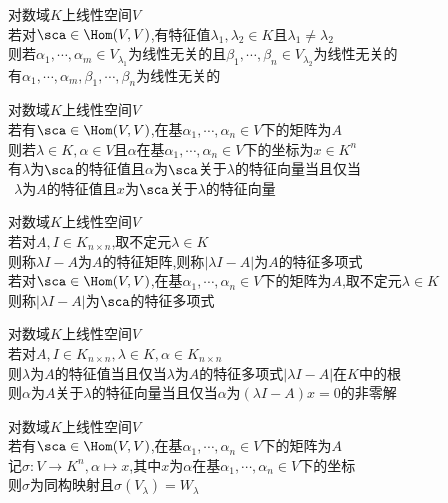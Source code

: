 \begin{dingli}
对数域$K$上线性空间$V$\\
若对$\sca\in\Hom(V,V)$,有特征值$\lambda_1,\lambda_2\in K$且$\lambda_1\neq\lambda_2$\\
则若$\alpha_1,\cdots,\alpha_m\in V_{\lambda_1}$为线性无关的且$\beta_1,\cdots,\beta_n\in V_{\lambda_2}$为线性无关的\\
有$\alpha_1,\cdots,\alpha_m,\beta_1,\cdots,\beta_n$为线性无关的
\end{dingli}

\begin{dingli}
对数域$K$上线性空间$V$\\
若有$\sca\in \Hom(V,V)$,在基$\alpha_1,\cdots,\alpha_n\in V$下的矩阵为$A$\\
则若$\lambda\in K,\alpha\in V$且$\alpha$在基$\alpha_1,\cdots,\alpha_n\in V$下的坐标为$x\in K^n$\\
有$\lambda$为$\sca$的特征值且$\alpha$为$\sca$关于$\lambda$的特征向量当且仅当\\
$\ \ \lambda$为$A$的特征值且$x$为$\sca$关于$\lambda$的特征向量
\end{dingli}

\begin{dingyi}
对数域$K$上线性空间$V$\\
若对$A,I\in K_{n\times n}$,取不定元$\lambda\in K$\\
则称$\lambda I-A$为$A$的特征矩阵,则称$|\lambda I-A|$为$A$的特征多项式\\
若对$\sca\in \Hom(V,V)$,在基$\alpha_1,\cdots,\alpha_n\in V$下的矩阵为$A$,取不定元$\lambda\in K$\\
则称$|\lambda I-A|$为$\sca$的特征多项式
\end{dingyi}

\begin{dingli}
对数域$K$上线性空间$V$\\
若对$A,I\in K_{n\times n},\lambda\in K,\alpha\in K_{n\times n}$\\
则$\lambda$为$A$的特征值当且仅当$\lambda$为$A$的特征多项式$|\lambda I-A|$在$K$中的根\\
则$\alpha$为$A$关于$\lambda$的特征向量当且仅当$\alpha$为$(\lambda I-A)x=0$的非零解
\end{dingli}

\begin{dingli}
对数域$K$上线性空间$V$\\
若有$\sca\in \Hom(V,V)$,在基$\alpha_1,\cdots,\alpha_n\in V$下的矩阵为$A$\\
记$\sigma:V\to K^n,\alpha\mapsto x$,其中$x$为$\alpha$在基$\alpha_1,\cdots,\alpha_n\in V$下的坐标\\
则$\sigma$为同构映射且$\sigma(V_{\lambda})=W_{\lambda}$
\end{dingli}

